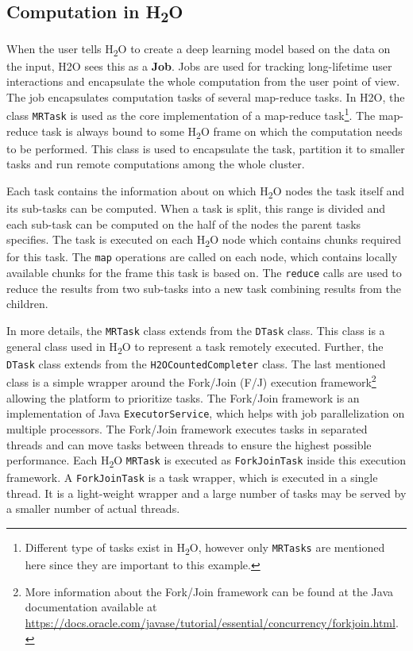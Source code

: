 \subsection{Computation in H\textsubscript{2}O}
When the user tells H\textsubscript{2}O to create a deep learning model based on the data on the input, H2O sees this as a \textbf{Job}. Jobs are used for tracking long-lifetime user interactions and encapsulate the whole computation from the user point of view. The job encapsulates computation tasks of several map-reduce tasks. In H2O, the class \texttt{MRTask} is used as the core implementation of a map-reduce task\footnote{Different type of tasks exist in H\textsubscript{2}O, however only \texttt{MRTasks} are mentioned here since they are important to this example.}. The map-reduce task is always bound to some H\textsubscript{2}O frame on which the computation needs to be performed. This class is used to encapsulate the task, partition it to smaller tasks and run remote computations among the whole cluster. 

Each task contains the information about on which H\textsubscript{2}O nodes the task itself and its sub-tasks can be computed. When a task is split, this range is divided and each sub-task can be computed on the half of the nodes the parent tasks specifies. The task is executed on each H\textsubscript{2}O node which contains chunks required for this task. The \texttt{map} operations are called on each node, which contains locally available chunks for the frame this task is based on. The \texttt{reduce} calls are used to reduce the results from two sub-tasks into a new task combining results from the children.

In more details, the \texttt{MRTask} class extends from the \texttt{DTask} class. This class is a general class used in H\textsubscript{2}O to represent a task remotely executed. Further, the \texttt{DTask} class extends from the \texttt{H2OCountedCompleter} class. The last mentioned class is a simple wrapper around the Fork/Join (F/J) execution framework\footnote{More information about the Fork/Join framework can be found at the Java documentation available at \url{https://docs.oracle.com/javase/tutorial/essential/concurrency/forkjoin.html}.} allowing the platform to prioritize tasks. The Fork/Join framework is an implementation of Java \texttt{ExecutorService}, which helps with job parallelization on multiple processors. The Fork/Join framework executes tasks in separated threads and can move tasks between threads to ensure the highest possible performance. Each H\textsubscript{2}O \texttt{MRTask} is executed as \texttt{ForkJoinTask} inside this execution framework. A \texttt{ForkJoinTask} is a task wrapper, which is executed in a single thread. It is a light-weight wrapper and a large number of tasks may be served by a smaller number of actual threads.

